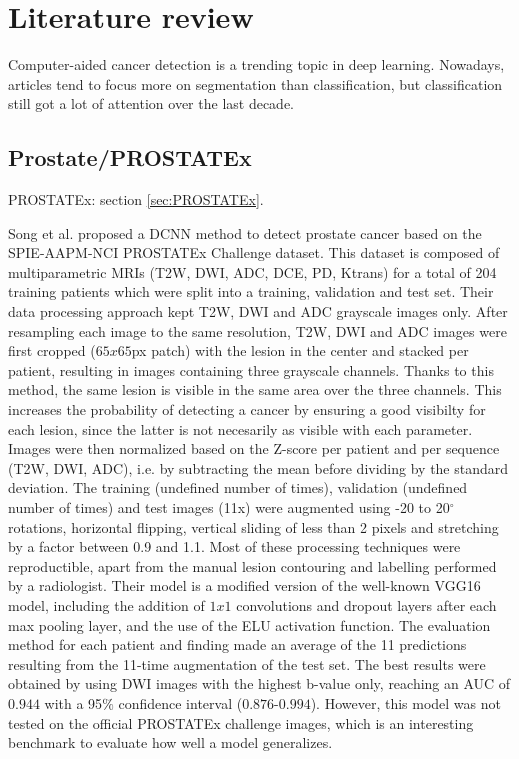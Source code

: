 
\chapter{Literature review}
\label{ch:literature_review}

Computer-aided cancer detection is a trending topic in deep learning. Nowadays, articles tend to focus more on segmentation than classification, but classification still got a lot of attention over the last decade. 

\section{Prostate/PROSTATEx}
PROSTATEx: section \ref{sec:PROSTATEx}.

Song et al. \cite{07} proposed a DCNN method to detect prostate cancer based on the SPIE-AAPM-NCI PROSTATEx Challenge dataset. This dataset is composed of multiparametric MRIs (T2W, DWI, ADC, DCE, PD, Ktrans) for a total of 204 training patients which were split into a training, validation and test set. Their data processing approach kept T2W, DWI and ADC grayscale images only. After resampling each image to the same resolution, T2W, DWI and ADC images were first cropped ($65x65$px patch) with the lesion in the center and stacked per patient, resulting in images containing three grayscale channels. Thanks to this method, the same lesion is visible in the same area over the three channels. This increases the probability of detecting a cancer by ensuring a good visibilty for each lesion, since the latter is not necesarily as visible with each parameter. Images were then normalized based on the Z-score per patient and per sequence (T2W, DWI, ADC), i.e. by subtracting the mean before dividing by the standard deviation. The training (undefined number of times), validation (undefined number of times) and test images (11x) were augmented using -20 to 20$^\circ$ rotations, horizontal flipping, vertical sliding of less than 2 pixels and stretching by a factor between 0.9 and 1.1. Most of these processing techniques were reproductible, apart from the manual lesion contouring and labelling performed by a radiologist. 
Their model is a modified version of the well-known VGG16 model, including the addition of $1x1$ convolutions and dropout layers after each max pooling layer, and the use of the ELU activation function. The evaluation method for each patient and finding made an average of the 11 predictions resulting from the 11-time augmentation of the test set. The best results were obtained by using DWI images with the highest b-value only, reaching an AUC of $0.944$ with a 95$\%$ confidence interval ($0.876$-$0.994$). However, this model was not tested on the official PROSTATEx challenge images, which is an interesting benchmark to evaluate how well a model generalizes.

